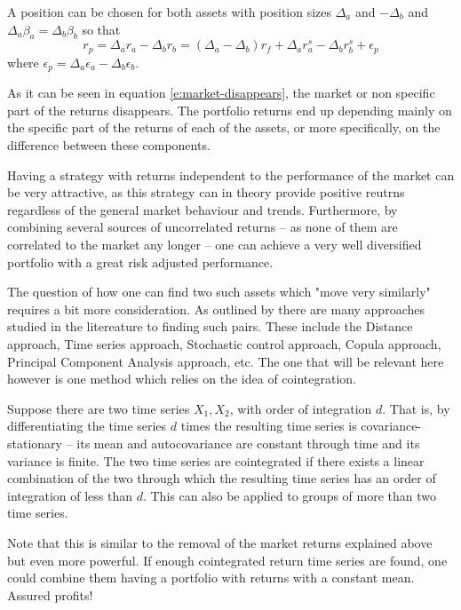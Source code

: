 A position can be chosen for both assets with position sizes $\Delta_a$ and $-\Delta_b$ and $\Delta_a\beta_a=\Delta_b\beta_b$ so that
\begin{equation}
    \label{e:market-disappears}
    r_p=\Delta_ar_a-\Delta_br_b=(\Delta_a-\Delta_b)r_f + \Delta_a r_a^s - \Delta_b r_b^s + \epsilon_p
\end{equation}
where $\epsilon_p = \Delta_a \epsilon_a - \Delta_b \epsilon_b$.

As it can be seen in equation \eqref{e:market-disappears}, the market or non specific part of the returns disappears. The portfolio returns end up depending mainly on the specific part of the returns of each of the assets, or more specifically, on the difference between these components. 

Having a strategy with returns independent to the performance of the market can be very attractive, as this strategy can in theory provide positive reutrns regardless of the general market behaviour and trends. Furthermore, by combining several sources of uncorrelated returns -- as none of them are correlated to the market any longer -- one can achieve a very well diversified portfolio with a great risk adjusted performance. 

The question of how one can find two such assets which "move very similarly" requires a bit more consideration. As outlined by \cite{review_statistical_arbitrage} there are many approaches studied in the litereature to finding such pairs. These include the Distance approach, Time series approach, Stochastic control approach, Copula approach, Principal Component Analysis approach, etc. The one that will be relevant here however is one method which relies on the idea of cointegration. 

Suppose there are two time series $X_1, X_2$, with order of integration $d$. That is, by differentiating the time series $d$ times the resulting time series is covariance-stationary -- its mean and autocovariance are constant through time and its variance is finite. The two time series are cointegrated if there exists a linear combination of the two through which the resulting time series has an order of integration of less than $d$. This can also be applied to groups of more than two time series.  

Note that this is similar to the removal of the market returns explained above but even more powerful. If enough cointegrated return time series are found, one could combine them having a portfolio with returns with a constant mean. Assured profits!

